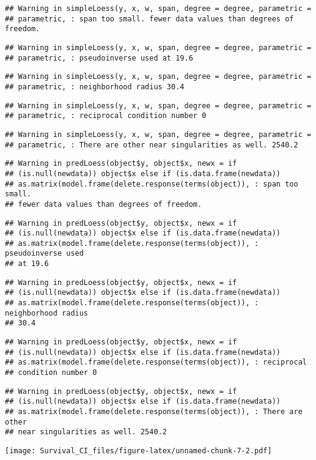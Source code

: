 \documentclass[]{article}
\begin{document}
\begin{verbatim}
## Warning in simpleLoess(y, x, w, span, degree = degree, parametric =
## parametric, : span too small. fewer data values than degrees of freedom.
\end{verbatim}

\begin{verbatim}
## Warning in simpleLoess(y, x, w, span, degree = degree, parametric =
## parametric, : pseudoinverse used at 19.6
\end{verbatim}

\begin{verbatim}
## Warning in simpleLoess(y, x, w, span, degree = degree, parametric =
## parametric, : neighborhood radius 30.4
\end{verbatim}

\begin{verbatim}
## Warning in simpleLoess(y, x, w, span, degree = degree, parametric =
## parametric, : reciprocal condition number 0
\end{verbatim}

\begin{verbatim}
## Warning in simpleLoess(y, x, w, span, degree = degree, parametric =
## parametric, : There are other near singularities as well. 2540.2
\end{verbatim}

\begin{verbatim}
## Warning in predLoess(object$y, object$x, newx = if
## (is.null(newdata)) object$x else if (is.data.frame(newdata))
## as.matrix(model.frame(delete.response(terms(object)), : span too small.
## fewer data values than degrees of freedom.
\end{verbatim}

\begin{verbatim}
## Warning in predLoess(object$y, object$x, newx = if
## (is.null(newdata)) object$x else if (is.data.frame(newdata))
## as.matrix(model.frame(delete.response(terms(object)), : pseudoinverse used
## at 19.6
\end{verbatim}

\begin{verbatim}
## Warning in predLoess(object$y, object$x, newx = if
## (is.null(newdata)) object$x else if (is.data.frame(newdata))
## as.matrix(model.frame(delete.response(terms(object)), : neighborhood radius
## 30.4
\end{verbatim}

\begin{verbatim}
## Warning in predLoess(object$y, object$x, newx = if
## (is.null(newdata)) object$x else if (is.data.frame(newdata))
## as.matrix(model.frame(delete.response(terms(object)), : reciprocal
## condition number 0
\end{verbatim}

\begin{verbatim}
## Warning in predLoess(object$y, object$x, newx = if
## (is.null(newdata)) object$x else if (is.data.frame(newdata))
## as.matrix(model.frame(delete.response(terms(object)), : There are other
## near singularities as well. 2540.2
\end{verbatim}

\texttt{[image: Survival\_CI\_files/figure-latex/unnamed-chunk-7-2.pdf]}
\end{document}
